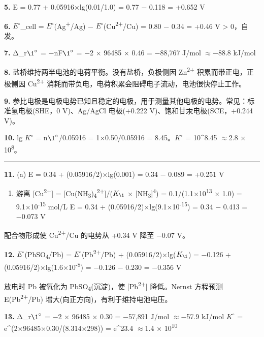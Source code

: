 \documentclass[a4paper,11pt]{ctexart}
\providecommand{\tightlist}{\setlength{\itemsep}{0pt}\setlength{\parskip}{0pt}}
\newcommand{\箭}{\ensuremath{\rightarrow}}
\newcommand{\左箭}{\ensuremath{\leftarrow}}
\newcommand{\上箭}{\ensuremath{\uparrow}}
\newcommand{\下箭}{\ensuremath{\downarrow}}
\newcommand{\衡}{\ensuremath{\rightleftharpoons}}
\newcommand{\双箭}{\ensuremath{\leftrightarrow}}
\newcommand{\约等于}{\ensuremath{\approx}}
\newcommand{\小于等于}{\ensuremath{\leq}}
\newcommand{\大于等于}{\ensuremath{\geq}}
\newcommand{\不等于}{\ensuremath{\neq}}
\newcommand{\西格马}{\ensuremath{\sigma}}
\newcommand{\派}{\ensuremath{\pi}}
\begin{document}
\textbf{5.} E = 0.77 + 0.05916×lg(0.01/1.0) = 0.77 − 0.118 = +0.652 V

\textbf{6.} \(E^{\circ}\)\_cell = \(E^{\circ}\)(Ag\textsuperscript{+}/Ag) − \(E^{\circ}\)(Cu\textsuperscript{2+}/Cu) = 0.80 − 0.34 = +0.46 V \textgreater{} 0，自发。

\textbf{7.} Δ\_r\(\1^{\circ}\) = −nF\(\1^{\circ}\) = −2 × 96485 × 0.46 = −88,767 J/mol \约等于 −88.8 kJ/mol

\textbf{8.} 盐桥维持两半电池的电荷平衡。没有盐桥，负极侧因 Zn\textsuperscript{2+} 积累而带正电，正极侧因 Cu\textsuperscript{2+} 消耗而带负电，电荷积累会阻碍电子流动，电池很快停止工作。

\textbf{9.} 参比电极是电极电势已知且稳定的电极，用于测量其他电极的电势。常见：标准氢电极(SHE，0 V)、Ag/AgCl 电极(+0.222 V)、饱和甘汞电极(SCE，+0.244 V)。

\textbf{10.} lg \(K^{\circ}\) = n\(\1^{\circ}\)/0.05916 = 1×0.50/0.05916 = 8.45。\(K^{\circ}\) = 10\^{}8.45 \约等于 2.8 × 10\textsuperscript{8}。

\begin{center}\rule{0.5\linewidth}{0.5pt}\end{center}

\textbf{11.}
(a) E = 0.34 + (0.05916/2)×lg(0.001) = 0.34 − 0.089 = +0.251 V

\begin{enumerate}
\def\labelenumi{(\alph{enumi})}
\setcounter{enumi}{1}
\tightlist
\item
  游离 {[}Cu\textsuperscript{2+}{]} = {[}Cu(NH\textsubscript{3})\textsubscript{4}\textsuperscript{2+}{]}/(\(K_{\1}\) × {[}NH\textsubscript{3}{]}\textsuperscript{4}) = 0.1/(1.1×10\textsuperscript{13} × 1.0) = 9.1×10\textsuperscript{-15} mol/L
  E = 0.34 + (0.05916/2)×lg(9.1×10\textsuperscript{-15}) = 0.34 − 0.413 = −0.073 V
\end{enumerate}

配合物形成使 Cu\textsuperscript{2+}/Cu 的电势从 +0.34 V 降至 −0.07 V。

\textbf{12.} \(E^{\circ}\)(PbSO\textsubscript{4}/Pb) = \(E^{\circ}\)(Pb\textsuperscript{2+}/Pb) + (0.05916/2)×lg(\(K_{\1}\)) = −0.126 + (0.05916/2)×lg(1.6×10\textsuperscript{-8}) = −0.126 − 0.230 = −0.356 V

放电时 Pb 被氧化为 PbSO\textsubscript{4}(沉淀)，使 {[}Pb\textsuperscript{2+}{]} 降低。Nernst 方程预测 E(Pb\textsuperscript{2+}/Pb) 增大(向正方向)，有利于维持电池电压。

\textbf{13.} Δ\_r\(\1^{\circ}\) = −2 × 96485 × 0.30 = −57,891 J/mol \约等于 −57.9 kJ/mol
\(K^{\circ}\) = e\^{}(2×96485×0.30/(8.314×298)) = e\^{}23.4 \约等于 1.4 × 10\textsuperscript{10}
\end{document}
